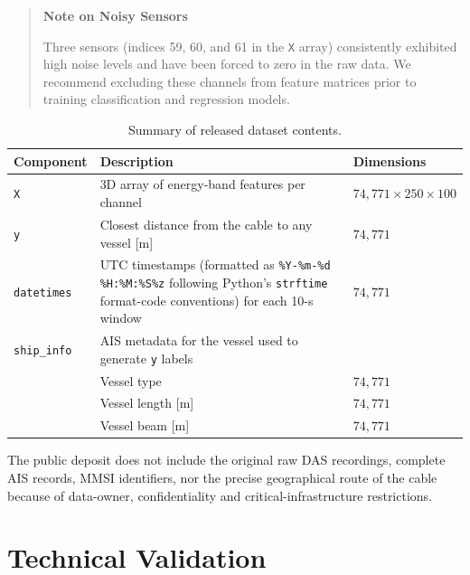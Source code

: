 \documentclass[11pt]{article}
\begin{document}
\begin{quote}
\textbf{Note on Noisy Sensors}

Three sensors (indices 59, 60, and 61 in the \texttt{X} array) consistently exhibited high noise levels and have been forced to zero in the raw data. We recommend excluding these channels from feature matrices prior to training classification and regression models.
\end{quote}

\begin{table}[H]
  \centering
  \caption{Summary of released dataset contents.}
  \label{tab:dataset-content}
  \begin{tabularx}{\linewidth}{@{}lXl@{}}\toprule
  \textbf{Component} & \textbf{Description} & \textbf{Dimensions} \\ \midrule
  \texttt{X} & 3D array of energy-band features per channel & $74{,}771 \times 250 \times 100$ \\
  \texttt{y} & Closest distance from the cable to any vessel [m] & $74{,}771$ \\
  \texttt{datetimes} & UTC timestamps (formatted as \texttt{\%Y-\%m-\%d \%H:\%M:\%S\%z} following Python’s \texttt{strftime} format-code conventions) for each 10-s window & $74{,}771$ \\
    \texttt{ship\_info} & AIS metadata for the vessel used to generate \texttt{y} labels &  \\
    & Vessel type & $74{,}771$ \\
    & Vessel length [m] & $74{,}771$ \\
    & Vessel beam [m] & $74{,}771$ \\
  \bottomrule
  \end{tabularx}
\end{table}

The public deposit does not include the original raw DAS recordings, complete AIS records, MMSI identifiers, nor the precise geographical route of the cable because of data-owner, confidentiality and critical-infrastructure restrictions.


\section{Technical Validation}
\label{sec:technical validation}
\end{document}
